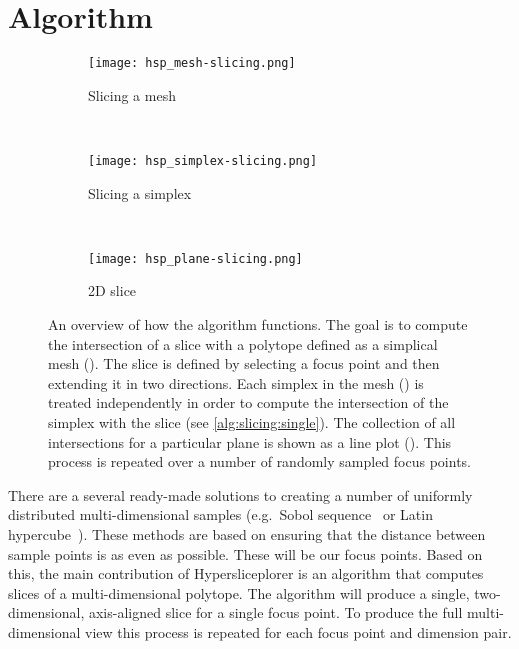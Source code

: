 \section{Algorithm}
\label{sec:algorithm}

\begin{figure*}[ht!]
  \centering
  \begin{subfigure}[b]{0.33\textwidth}
    \texttt{[image: hsp\_mesh-slicing.png]}
    \caption{%
      Slicing a mesh
    }
    \label{fig:slicing:mesh}
  \end{subfigure}
  ~
  \begin{subfigure}[b]{0.33\textwidth}
    \centering
    \texttt{[image: hsp\_simplex-slicing.png]}
    \caption{%
      Slicing a simplex
    }
    \label{fig:slicing:simplex}
  \end{subfigure}
  ~
  \begin{subfigure}[b]{0.24\textwidth}
    \centering
    \texttt{[image: hsp\_plane-slicing.png]}
    \caption{%
      2D slice
    }
    \label{fig:slicing:plane}
  \end{subfigure}
  \caption{%
    An overview of how the algorithm functions. The goal is to compute the
    intersection of a slice with a polytope defined as a simplical mesh
    (). The slice is defined by selecting a focus
    point and then extending it in two directions. Each simplex in the mesh
    () is treated
    independently in order to compute the intersection of the simplex with 
    the slice
    (see \autoref{alg:slicing:single}). The collection of all intersections
    for a particular plane is shown as a line plot 
    (). This process is repeated over a number of 
    randomly sampled focus points.
  }
  \label{fig:slicing}
\end{figure*}

There are a several ready-made solutions to creating a number of uniformly
distributed multi-dimensional samples (e.g.\ Sobol sequence~\cite{Sobol:1967}
or Latin hypercube~\cite{Mckay:1979}). These methods are based on ensuring that
the distance between sample points is as even as possible.  These will be our
focus points. Based on this, the main contribution of Hypersliceplorer is an algorithm
that computes slices of a multi-dimensional polytope.  The algorithm will produce a
single, two-dimensional, axis-aligned slice for a single focus point. To produce
the full multi-dimensional view this process is repeated for each focus point
and dimension pair.

